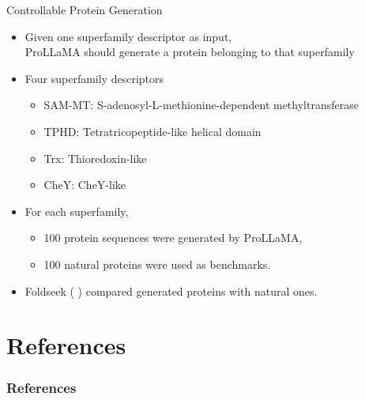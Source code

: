 \documentclass[dvipsnames,
hyperref={
	citecolor=blue,
	colorlinks=true,
	urlcolor=blue,
	linkcolor=,
}
]{beamer}
\let\oldcite\cite
\renewcommand{\cite}[1]{{\color{blue} \oldcite{#1}}}
\begin{document}




\begin{frame}{Controllable Protein Generation}%
	\begin{itemize}
		\item Given one superfamily descriptor as input, 
		\\ProLLaMA should generate a protein belonging to that superfamily
		\item Four superfamily descriptors
		\begin{itemize}
			\item SAM-MT: S-adenosyl-L-methionine-dependent methyltransferase
			\item TPHD: Tetratricopeptide-like helical domain
			\item Trx: Thioredoxin-like 
			\item CheY: CheY-like
		\end{itemize}
		\item For each superfamily,
		\begin{itemize}
			\item 100 protein sequences were generated by ProLLaMA,
			\item 100 natural proteins were used as benchmarks.
		\end{itemize}
		\item Foldseek (\cite{van2024fast}) compared generated proteins with natural ones.
	\end{itemize}
\end{frame}

















\section{References}
\begin{frame}[allowframebreaks]
\frametitle{References}
\printbibliography
\end{frame}

%
\end{document}
